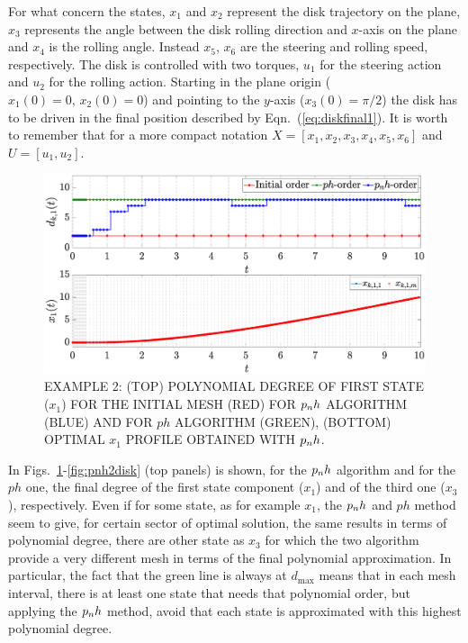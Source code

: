 For what concern the states, $x_1$ and $x_2$ represent the disk trajectory on the plane, $x_3$ represents the angle between the disk rolling direction and $x$-axis on the plane and $x_4$ is the rolling angle. Instead $x_5$, $x_6$ are the steering and rolling speed, respectively.
The disk is controlled with two torques, $u_1$ for the steering action and $u_2$ for the rolling action. Starting in the plane origin ($x_1(0) = 0, \, x_2(0) = 0$) and pointing to the $y$-axis ($x_3(0) = \pi/2$) the disk has to be driven in the final position described by
Eqn.~(\ref{eq:diskfinal1}). It is worth to remember that for a more compact notation $X = [x_1, x_2, x_3, x_4, x_5, x_6]$  and $U = [u_1, u_2]$.
\begin{figure}[t]
	\centering
	\includegraphics[trim={1cm 0.1cm 2cm 1.05cm},clip,width=1\columnwidth]{Img/pnh1_disk1}
	\caption{EXAMPLE 2: (TOP) POLYNOMIAL DEGREE OF FIRST STATE ($x_{1}$) FOR THE INITIAL MESH (RED) FOR $p_{n}h$ ALGORITHM (BLUE) AND FOR $ph$ ALGORITHM (GREEN), (BOTTOM)
		OPTIMAL $x_1$ PROFILE OBTAINED WITH $p_{n}h$.}
	\label{fig:pnh1disk}
\end{figure}
In Figs.~\ref{fig:pnh1disk}-\ref{fig:pnh2disk} (top panels) is shown, for the $p_{n}h$ algorithm and for the $ph$ one, the final degree of the first state component ($x_1$) and of the third one ($x_3$), respectively. Even if for some state, as for example $x_1$, the $p_{n}h$ and $ph$ method seem to give, for certain sector of optimal solution, the same results in terms of polynomial degree, there are other state as $x_3$ for which the two algorithm provide a very different mesh in terms of the final polynomial approximation.
In particular, the fact that the green line is always at $d_\text{max}$ means that in each mesh interval, there is at least one state that needs that polynomial order, but applying the $p_{n}h$ method, avoid that each state is approximated with this highest polynomial degree. 
